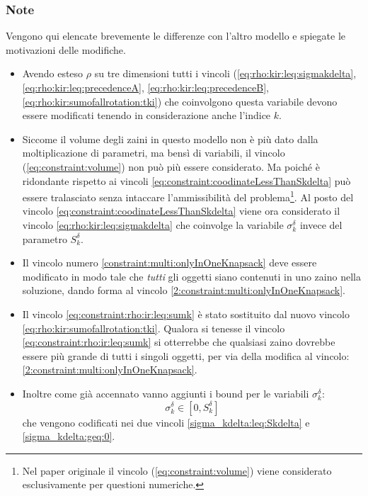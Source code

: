 \documentclass{scrartcl}
\begin{document}
\subsubsection{Note}
Vengono qui elencate brevemente le differenze con l'altro modello e spiegate le motivazioni delle modifiche.
\begin{itemize}
\item Avendo esteso $\rho$ su tre dimensioni tutti i vincoli (\ref{eq:rho:kir:leq:sigmakdelta}, \ref{eq:rho:kir:leq:precedenceA}, \ref{eq:rho:kir:leq:precedenceB}, \ref{eq:rho:kir:sumofallrotation:tki}) che coinvolgono questa variabile devono essere modificati tenendo in considerazione anche l'indice $k$.

\item Siccome il volume degli zaini in questo modello non è più dato dalla moltiplicazione di parametri, ma bensì di variabili, il vincolo
(\ref{eq:constraint:volume}) non può più essere considerato. 
Ma poiché è ridondante rispetto ai vincoli \ref{eq:constraint:coodinateLessThanSkdelta}
può essere tralasciato senza intaccare l'ammissibilità del problema\footnote{Nel paper originale il vincolo (\ref{eq:constraint:volume}) viene considerato esclusivamente per questioni numeriche.}. Al posto del vincolo \ref{eq:constraint:coodinateLessThanSkdelta} viene ora considerato il vincolo \ref{eq:rho:kir:leq:sigmakdelta} che coinvolge la variabile $\sigma_k^\delta$ invece del parametro $S_k^\delta$.

\item Il vincolo numero \ref{constraint:multi:onlyInOneKnapsack} deve essere modificato in modo tale che \emph{tutti} gli oggetti siano contenuti in uno zaino nella soluzione, dando forma al vincolo \ref{2:constraint:multi:onlyInOneKnapsack}.

\item Il vincolo \ref{eq:constraint:rho:ir:leq:sumk} è stato sostituito dal nuovo vincolo \ref{eq:rho:kir:sumofallrotation:tki}. Qualora si tenesse il vincolo \ref{eq:constraint:rho:ir:leq:sumk} si otterrebbe che qualsiasi zaino  dovrebbe essere più grande di tutti i singoli oggetti, per via della modifica al vincolo: \ref{2:constraint:multi:onlyInOneKnapsack}.

\item Inoltre come già accennato vanno aggiunti i bound per le variabili $\sigma_k^\delta$:
\begin{equation}
\sigma_k^\delta \in [ 0, S_k^\delta ]
\end{equation}
che vengono codificati nei due vincoli
\ref{sigma_kdelta:leq:Skdelta} e \ref{sigma_kdelta:geq:0}.
\end{itemize}
\end{document}
